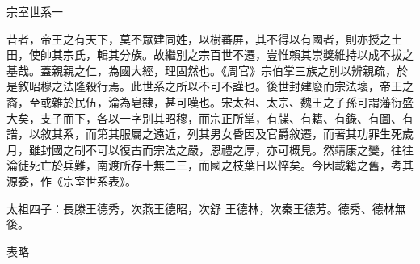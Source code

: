 
\begin{pinyinscope}

 宗室世系一



 昔者，帝王之有天下，莫不眾建同姓，以樹蕃屏，其不得以有國者，則亦授之土田，使帥其宗氏，輯其分族。故繼別之宗百世不遷，豈惟賴其崇獎維持以成不拔之基哉。蓋親親之仁，為國大經，理固然也。《周官》宗伯掌三族之別以辨親疏，於是敘昭穆之法隆殺行焉。此世系之所以不可不謹也。後世封建廢而宗法壞，帝王之裔，至或雜於民伍，淪為皂隸，甚可嘆也。宋太祖、太宗、魏王之子孫可謂藩衍盛大矣，支子而下，各以一字別其昭穆，而宗正所掌，有牒、有籍、有錄、有圖、有譜，以敘其系，而第其服屬之遠近，列其男女昏因及官爵敘遷，而著其功罪生死歲月，雖封國之制不可以復古而宗法之嚴，恩禮之厚，亦可概見。然靖康之變，往往淪徙死亡於兵難，南渡所存十無二三，而國之枝葉日以悴矣。今因載籍之舊，考其源委，作《宗室世系表》。



 太祖四子：長滕王德秀，次燕王德昭，次舒
 王德林，次秦王德芳。德秀、德林無後。



 表略



\end{pinyinscope}